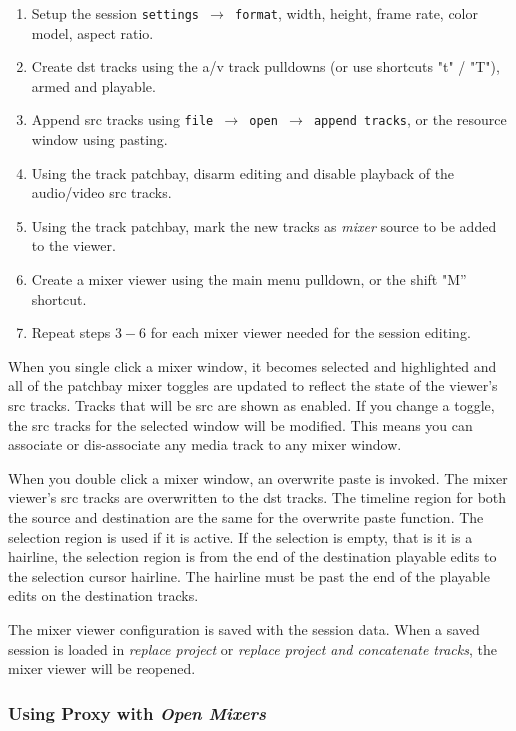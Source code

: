 \begin{enumerate}
	\item Setup the session \texttt{settings $\rightarrow$ format}, width, height, frame rate, color model, aspect ratio.
	\item Create dst tracks using the a/v track pulldowns (or use shortcuts "t" / "T"),  armed and playable.
	\item Append src tracks using \texttt{file $\rightarrow$ open $\rightarrow$ append tracks}, or the resource window using pasting.
	\item Using the track patchbay, disarm editing and disable playback of the audio/video src tracks.
	\item Using the track patchbay, mark the new tracks as \textit{mixer} source to be added to the viewer.
	\item Create a mixer viewer using the main menu pulldown, or the shift "M” shortcut.
	\item Repeat steps $3-6$ for each mixer viewer needed for the session editing.
\end{enumerate}

When you single click a mixer window, it becomes selected and highlighted and all of the patchbay mixer toggles are updated to reflect the state of the viewer’s src tracks.  Tracks that will be src are shown as enabled.  If you change a toggle, the src tracks for the selected window will be modified.  This means you can associate or dis-associate any media track to any mixer window.

When you double click a mixer window, an overwrite paste is invoked.  The mixer viewer’s src tracks are overwritten to the dst tracks.  The timeline region for both the source and destination are the same for the overwrite paste function.  The selection region is used if it is active.  If the selection is empty, that is it is a hairline, the selection region is from the end of the destination playable edits to the selection cursor hairline.  The hairline must be past the end of the playable edits on the destination tracks.

The mixer viewer configuration is saved with the session data.  When a saved session is loaded in \textit{replace project} or \textit{replace project and concatenate tracks}, the mixer viewer will be reopened.

\subsubsection*{Using Proxy with \textit{Open Mixers}}%
\label{ssub:using_proxy_open_mixers}

